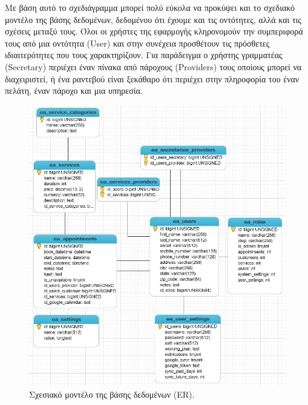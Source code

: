 Με βάση αυτό το σχεδιάγραμμα μπορεί πολύ εύκολα να προκύψει και το σχεδιακό μοντέλο της βάσης δεδομένων, δεδομένου ότι έχουμε και τις οντότητες, αλλά και τις σχέσεις μεταξύ τους. Όλοι οι χρήστες της εφαρμογής κληρονομούν την συμπεριφορά τους από μια οντότητα (User) και στην συνέχεια προσθέτουν τις πρόσθετες ιδιαιτερότητες που τους χαρακτηρίζουν. Για παράδειγμα ο χρήστης γραμματέας (Secretary) περιέχει έναν πίνακα από πάροχους (Providers) τους οποίους μπορεί να διαχειριστεί, ή ένα ραντεβού είναι ξεκάθαρο ότι περιέχει στην πληροφορία του έναν πελάτη, έναν πάροχο και μια υπηρεσία.

\begin{figure}[ht!]
\centering
\includegraphics[width=160mm]{images/er.png}
\caption{Σχεσιακό μοντέλο της βάσης δεδομένων (ER).}
\label{er}
\end{figure}

